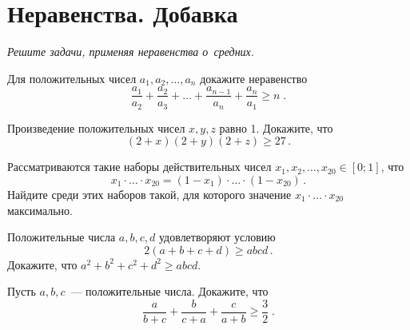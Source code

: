 
\section*{Неравенства. Добавка}



\vspace{-1ex}
\emph{Решите задачи, применяя неравенства о~средних.}
\vspace{1ex}

\begin{problems}


\item
Для положительных чисел $a_1, a_2, \ldots, a_n$ докажите неравенство
\[
    \frac{a_1}{a_2} + \frac{a_2}{a_3}
    + \ldots +
    \frac{a_{n-1}}{a_n} + \frac{a_n}{a_1}
\geq
    n
\;.\]

\item
Произведение положительных чисел $x, y, z$ равно 1.
Докажите, что
\[
    (2 + x) (2 + y) (2 + z) \geq 27
\,.\]

\item
Рассматриваются такие наборы действительных чисел
$x_1, x_2, \ldots, x_{20} \in [0; 1]$,
что
\[
    x_1 \cdot \ldots \cdot x_{20}
=
    (1 - x_1) \cdot \ldots \cdot (1 - x_{20})
\,.\]
Найдите среди этих наборов такой, для которого значение
$x_1 \cdot \ldots \cdot x_{20}$ максимально.

\item
Положительные числа $a, b, c, d$ удовлетворяют условию\enspace
\[
    2 (a + b + c + d) \geq abcd
\,.\]
Докажите, что\enspace
$a^2 + b^2 + c^2 + d^2 \geq abcd$.

\item
Пусть $a, b, c$~--- положительные числа.
Докажите, что
\[
    \frac{a}{b + c} + \frac{b}{c + a} + \frac{c}{a + b}
\geq
    \frac{3}{2}
\;.\]

\end{problems}

